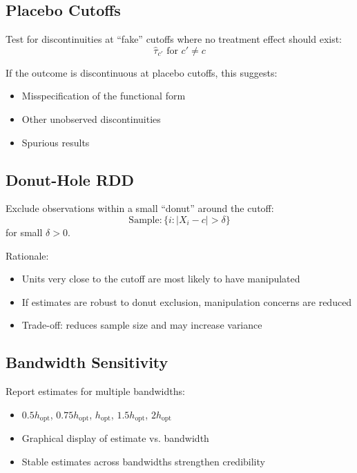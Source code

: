 \subsection{Placebo Cutoffs}

\begin{definition}
Test for discontinuities at ``fake'' cutoffs where no treatment effect should exist:
\begin{equation}
    \hat{\tau}_{c'} \text{ for } c' \neq c
\end{equation}
\end{definition}

If the outcome is discontinuous at placebo cutoffs, this suggests:
\begin{itemize}
    \item Misspecification of the functional form
    \item Other unobserved discontinuities
    \item Spurious results
\end{itemize}

\subsection{Donut-Hole RDD}

\begin{definition}
Exclude observations within a small ``donut'' around the cutoff:
\begin{equation}
    \text{Sample}: \{i : |X_i - c| > \delta\}
\end{equation}
for small $\delta > 0$.
\end{definition}

Rationale:
\begin{itemize}
    \item Units very close to the cutoff are most likely to have manipulated
    \item If estimates are robust to donut exclusion, manipulation concerns are reduced
    \item Trade-off: reduces sample size and may increase variance
\end{itemize}

\subsection{Bandwidth Sensitivity}

Report estimates for multiple bandwidths:
\begin{itemize}
    \item $0.5 h_{\text{opt}}$, $0.75 h_{\text{opt}}$, $h_{\text{opt}}$, $1.5 h_{\text{opt}}$, $2 h_{\text{opt}}$
    \item Graphical display of estimate vs. bandwidth
    \item Stable estimates across bandwidths strengthen credibility
\end{itemize}

